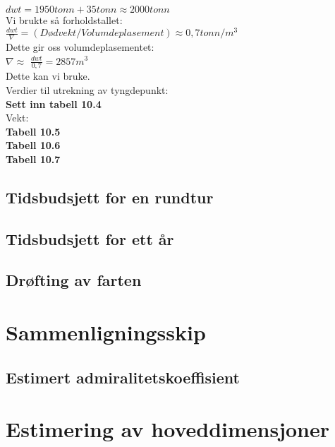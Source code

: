\documentclass[norsk]{article}
\begin{document}
$dwt=1950tonn+35tonn \approx 2000tonn$ \\

Vi brukte så forholdstallet:\\

\(\frac{dwt}{\nabla}\)$=(Dødvekt/Volumdeplasement) \approx 0,7tonn/m^3$ \\

Dette gir oss volumdeplasementet:\\ 

$\nabla \approx$ \(\frac{dwt}{0,7}\)$=2857m^3$ \\

Dette kan vi bruke. 
\newline\\
Verdier til utrekning av tyngdepunkt:\\ \textbf{Sett inn tabell 10.4}
\newline\\
Vekt: \\
\textbf{Tabell 10.5}
\newline\\ 
\textbf{Tabell 10.6}
\newline\\
\textbf{Tabell 10.7}
\newline\\


	\subsection{Tidsbudsjett for en rundtur}
	\subsection{Tidsbudsjett for ett år}
	\subsection{Drøfting av farten}

\section{Sammenligningsskip}
	\subsection{Estimert admiralitetskoeffisient}

\section{Estimering av hoveddimensjoner}
\end{document}
